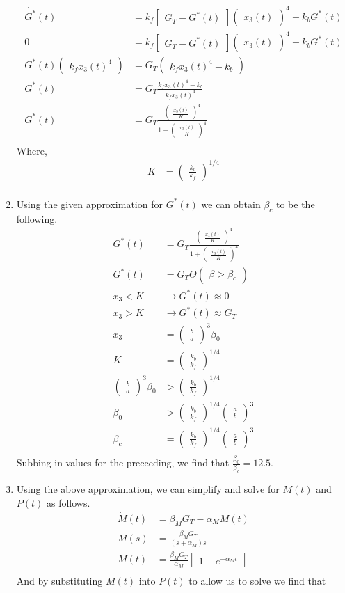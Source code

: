 \documentclass[10pt]{article}
\newcommand{\p}{\begin{pmatrix}}
\newcommand{\pp}{\end{pmatrix}}
\newcommand{\bm}{\begin{bmatrix}}
\newcommand{\bb}{\end{bmatrix}}
\newcommand{\eul}[1]{e^{#1}}
\begin{document}
\begin{enumerate}
\begin{align*}
\dot{G^*}(t) &= k_f \bm G_T - G^*(t) \bb \p x_3(t) \pp ^4 - k_b G^*(t) \\
0 &= k_f \bm G_T - G^*(t) \bb \p x_3(t) \pp ^4 - k_b G^*(t) \\
G^*(t) \p k_fx_3(t)^4 \pp &= G_T \p k_fx_3(t)^4 - k_b \pp \\
G^*(t) &= G_T \frac{k_f x_3(t)^4 - k_b}{k_f x_3(t)^4} \\
G^*(t) &= G_T \frac{ \p \frac{x_3(t)}{K} \pp^4}{1 + \p \frac{x_3(t)}{K} \pp ^4} \\
\end{align*}
Where, \\
\begin{align*}
K &= \p\frac{k_b}{k_f}\pp^{1/4} \\
\end{align*}
\item Using the given approximation for $G^*(t)$ we can obtain $\beta_c$ to be the following.
\begin{align*}
G^*(t) &= G_T \frac{ \p \frac{x_3(t)}{K} \pp^4}{1 + \p \frac{x_3(t)}{K} \pp ^4} \\
G^*(t) &= G_T \Theta \p \beta > \beta_c \pp \\
x_3 < K &\to G^*(t) \approx 0 \\
x_3 > K &\to G^*(t) \approx G_T \\
x_3 &= \p \frac{b}{a} \pp ^3\beta_0 \\
K &= \p\frac{k_b}{k_f}\pp^{1/4} \\
\p \frac{b}{a} \pp^3 \beta_0 &> \p\frac{k_b}{k_f}\pp^{1/4} \\
\beta_0 &> \p\frac{k_b}{k_f}\pp^{1/4} \p \frac{a}{b} \pp ^3 \\
\beta_c &= \p\frac{k_b}{k_f}\pp^{1/4} \p \frac{a}{b} \pp ^3 \\
\end{align*}
Subbing in values for the preceeding, we find that $\frac{\beta_0}{\beta_c} = 12.5$.
\item Using the above approximation, we can simplify and solve for $M(t)$ and $P(t)$ as follows.
\begin{align*}
\dot{M}(t) &= \beta_MG_T - \alpha_M M(t) \\
M(s) &= \frac{\beta_MG_T}{(s + \alpha_M)s} \\
M(t) &= \frac{\beta_MG_T}{\alpha_M} \bm 1 - \eul{-\alpha_Mt} \bb \\
\end{align*}
And by substituting $M(t)$ into $P(t)$ to allow us to solve we find that \\

\end{enumerate}
\end{document}
